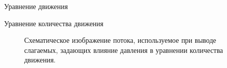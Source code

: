 \begin{chapter}{Уравнение движения}
\begin{section}{Уравнение количества движения}
\begin{figure}[h!]
\caption{Схематическое изображение потока, используемое при выводе слагаемых,
задающих влияние давления в уравнении количества движения.}
\label{fig:pressuresketch}
\end{figure}
%
% 


\end{section}
\end{chapter}

